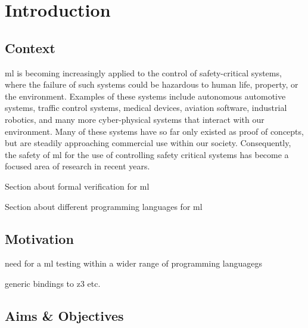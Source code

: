 
\chapter{Introduction} %
\label{Chapter1} %



\section{Context}

\Gls{ml} is becoming increasingly applied to the control of safety-critical systems, where the failure of such systems could be hazardous to human life, property, or the environment.
Examples of these systems include autonomous automotive systems, traffic control systems, medical devices, aviation software, industrial robotics, and many more cyber-physical systems that interact with our environment.
Many of these systems have so far only existed as proof of concepts, but are steadily approaching commercial use within our society.
Consequently, the safety of \gls{ml} for the use of controlling safety critical systems has become a focused area of research in recent years.

Section about formal verification for ml

Section about different programming languages for ml



\section{Motivation}


need for a ml testing within a wider range of programming languagegs

generic bindings to z3 etc.


\section{Aims \& Objectives}
